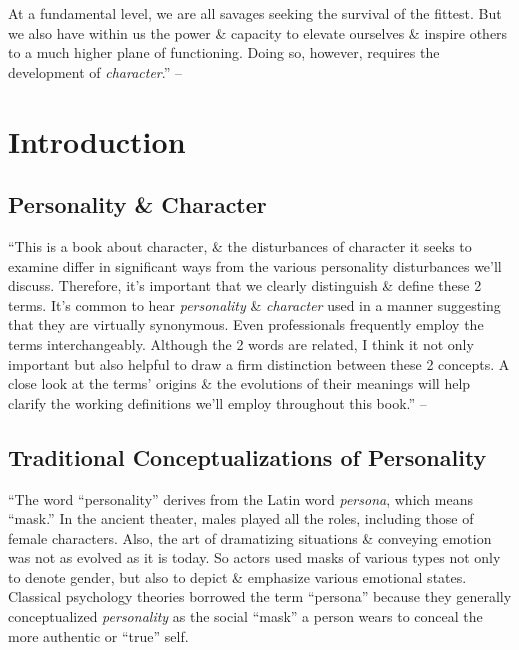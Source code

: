 \documentclass{article}
\numberwithin{equation}{section}
\begin{document}
At a fundamental level, we are all savages seeking the survival of the fittest. But we also have within us the power \& capacity to elevate ourselves \& inspire others to a much higher plane of functioning. Doing so, however, requires the development of \textit{character}.'' -- \cite[pp. 8--19]{Simon2011}


\section*{Introduction}

\subsection*{Personality \& Character}
``This is a book about character, \& the disturbances of character it seeks to examine differ in significant ways from the various personality disturbances we'll discuss. Therefore, it's important that we clearly distinguish \& define these 2 terms. It's common to hear \textit{personality} \& \textit{character} used in a manner suggesting that they are virtually synonymous. Even professionals frequently employ the terms interchangeably. Although the 2 words are related, I think it not only important but also helpful to draw a firm distinction between these 2 concepts. A close look at the terms' origins \& the evolutions of their meanings will help clarify the working definitions we'll employ throughout this book.'' -- \cite[p. 20]{Simon2011}

\subsection*{Traditional Conceptualizations of Personality}
``The word ``personality'' derives from the Latin word \textit{persona}, which means ``mask.'' In the ancient theater, males played all the roles, including those of female characters. Also, the art of dramatizing situations \& conveying emotion was not as evolved as it is today. So actors used masks of various types not only to denote gender, but also to depict \& emphasize various emotional states. Classical psychology theories borrowed the term ``persona'' because they generally conceptualized \textit{personality} as the social ``mask'' a person wears to conceal the more authentic or ``true'' self.
\end{document}

